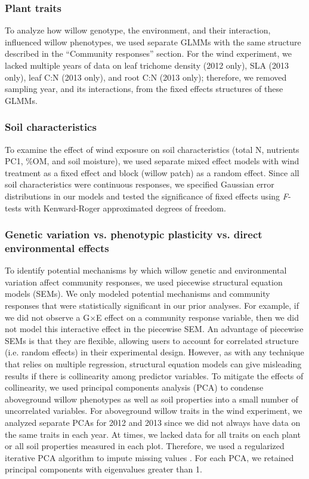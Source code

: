 \documentclass[11pt]{article}
\begin{document}
\subsubsection*{Plant traits}

To analyze how willow genotype, the environment, and their interaction, influenced willow phenotypes, we used separate GLMMs with the same structure described in the ``Community responses” section. For the wind experiment, we lacked multiple years of data on leaf trichome density (2012 only), SLA (2013 only), leaf C:N (2013 only), and root C:N (2013 only); therefore, we removed sampling year, and its interactions, from the fixed effects structures of these GLMMs.

\subsubsection*{Soil characteristics}

To examine the effect of wind exposure on soil characteristics (total N,
nutrients PC1, \%OM, and soil moisture), we used separate mixed effect
models with wind treatment as a fixed effect and block (willow patch) as
a random effect. Since all soil characteristics were continuous
responses, we specified Gaussian error distributions in our models and
tested the significance of fixed effects using \emph{F}-tests with
Kenward-Roger approximated degrees of freedom.

\subsubsection*{Genetic variation vs. phenotypic plasticity vs.
direct environmental
effects}

To identify potential mechanisms by which willow genetic and
environmental variation affect community responses, we used piecewise
structural equation models (SEMs)\cite{Lefcheck_2015}. We only modeled
potential mechanisms and community responses that were statistically
significant in our prior analyses. For example, if we did not observe a
G$\times$E effect on a community response variable, then we did
not model this interactive effect in the piecewise SEM. An advantage of
piecewise SEMs is that they are flexible, allowing users to account for
correlated structure (i.e. random effects) in their experimental design.
However, as with any technique that relies on multiple regression,
structural equation models can give misleading results if there is
collinearity among predictor variables. To mitigate the effects of
collinearity, we used principal components analysis (PCA) to condense
aboveground willow phenotypes as well as soil properties into a small
number of uncorrelated variables. For aboveground willow traits in the
wind experiment, we analyzed separate PCAs for 2012 and 2013 since we
did not always have data on the same traits in each year. At times, we
lacked data for all traits on each plant or all soil properties measured
in each plot. Therefore, we used a regularized iterative PCA algorithm
to impute missing values \cite{josse2012handling}. For each PCA, we retained
principal components with eigenvalues greater than 1.
\end{document}
